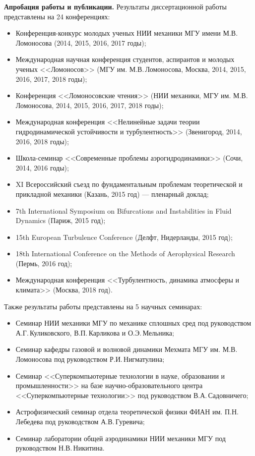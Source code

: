 {\bf Апробация работы и публикации.} 
Результаты диссертационной работы представлены на 24 конференциях: 
\begin{itemize}
\item Конференция-конкурс молодых ученых НИИ механики МГУ имени М.В. Ломоносова (2014, 2015, 2016, 2017 годы); 
\item Международная научная конференция студентов, аспирантов и молодых ученых <<Ломоносов>> (МГУ им. М.В.\,Ломоносова, Москва, 2014, 2015, 2016, 2017, 2018 годы); 
\item Конференция <<Ломоносовские чтения>> (НИИ механики, МГУ им. М.В. Ломоносова, 2014, 2015, 2016, 2017, 2018 годы); 
\item Международная конференция <<Нелинейные задачи теории гидродинамической устойчивости и турбулентность>> (Звенигород, 2014, 2016, 2018 годы); 
\item Школа-семинар <<Современные проблемы аэрогидродинамики>> (Сочи, 2014, 2016 годы);  
\item XI Всероссийский съезд по фундаментальным проблемам теоретической и прикладной механики (Казань, 2015 год) --- пленарный доклад;
\item 7th International Symposium on Bifurcations and Instabilities in Fluid Dynamics (Париж, 2015 год);
\item 15th European Turbulence Conference (Делфт, Нидерланды, 2015 год); 
\item 18th International Conference on the Methods of Aerophysical Research (Пермь, 2016 год);
\item Международная конференция <<Турбулентность, динамика атмосферы и климата>> (Москва, 2018 год).
\end{itemize}
Также результаты работы представлены на 5 научных семинарах:
\begin{itemize}
\item Семинар НИИ механики МГУ по механике сплошных сред под руководством А.Г.\,Куликовского, В.П.\,Карликова и О.Э.\,Мельника;
\item Семинар кафедры газовой и волновой динамики Мехмата МГУ им. М.В. Ломоносова под руководством Р.И.\,Нигматулина;
\item Семинар <<Суперкомпьютерные технологии в науке, образовании и промышленности>> на базе научно-образовательного центра <<Суперкомпьютерные технологии>> под руководством В.А.\,Садовничего;
\item Астрофизический семинар отдела теоретической физики ФИАН им. П.Н.\,Лебедева под руководством А.В.\,Гуревича;
\item Семинар лаборатории общей аэродинамики НИИ механики МГУ под руководством Н.В.\,Никитина.
\end{itemize}
